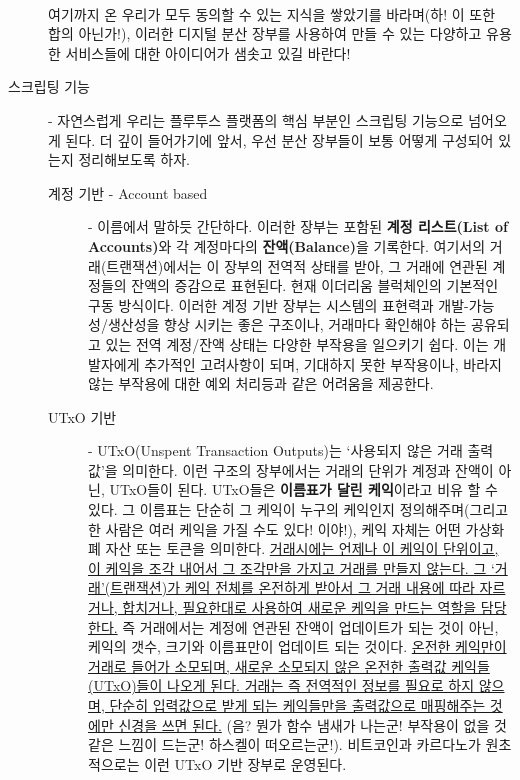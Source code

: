 \documentclass[a4paper, 11pt]{article}
\begin{document}
\begin{description}
        \paragraph{} 여기까지 온 우리가 모두 동의할 수 있는 지식을 쌓았기를 바라며(하! 이 또한 합의 아닌가!), 이러한 디지털 분산 장부를 사용하여 만들 수 있는 다양하고 유용한 서비스들에 대한 아이디어가 샘솟고 있길 바란다!
        
        \item[스크립팅 기능] - 자연스럽게 우리는 플루투스 플랫폼의 핵심 부분인 스크립팅 기능으로 넘어오게 된다. 더 깊이 들어가기에 앞서, 우선 분산 장부들이 보통 어떻게 구성되어 있는지 정리해보도록 하자.
        
        \begin{description}
            \item[계정 기반 - Account based] - 이름에서 말하듯 간단하다. 이러한 장부는 포함된 \textbf{계정 리스트(List of Accounts)}와 각 계정마다의 \textbf{잔액(Balance)}을 기록한다. 여기서의 거래(트랜잭션)에서는 이 장부의 전역적 상태를 받아, 그 거래에 연관된 계정들의 잔액의 증감으로 표현된다. 현재 이더리움 블럭체인의 기본적인 구동 방식이다. 이러한 계정 기반 장부는 시스템의 표현력과 개발-가능성/생산성을 향상 시키는 좋은 구조이나, 거래마다 확인해야 하는 공유되고 있는 전역 계정/잔액 상태는 다양한 부작용을 일으키기 쉽다. 이는 개발자에게 추가적인 고려사항이 되며, 기대하지 못한 부작용이나, 바라지 않는 부작용에 대한 예외 처리등과 같은 어려움을 제공한다.

            \item[UTxO 기반] - UTxO(Unspent Transaction Outputs)는 `사용되지 않은 거래 출력값'을 의미한다. 이런 구조의 장부에서는 거래의 단위가 계정과 잔액이 아닌, UTxO들이 된다. UTxO들은 \textbf{이름표가 달린 케익}이라고 비유 할 수 있다. 그 이름표는 단순히 그 케익이 누구의 케익인지 정의해주며(그리고 한 사람은 여러 케익을 가질 수도 있다! 이야!), 케익 자체는 어떤 가상화폐 자산 또는 토큰을 의미한다. \uline{거래시에는 언제나 이 케익이 단위이고, 이 케익을 조각 내어서 그 조각만을 가지고 거래를 만들지 않는다. 그 `거래'(트랜잭션)가 케익 전체를 온전하게 받아서 그 거래 내용에 따라 자르거나, 합치거나, 필요한대로 사용하여 새로운 케익을 만드는 역할을 담당한다.} 즉 거래에서는 계정에 연관된 잔액이 업데이트가 되는 것이 아닌, 케익의 갯수, 크기와 이름표만이 업데이트 되는 것이다. \uline{온전한 케익만이 거래로 들어가 소모되며, 새로운 소모되지 않은 온전한 출력값 케익들(UTxO)들이 나오게 된다. 거래는 즉 전역적인 정보를 필요로 하지 않으며, 단순히 입력값으로 받게 되는 케익들만을 출력값으로 매핑해주는 것에만 신경을 쓰면 된다.} (음? 뭔가 함수 냄새가 나는군! 부작용이 없을 것 같은 느낌이 드는군! 하스켈이 떠오르는군!). 비트코인과 카르다노가 원초적으로는 이런 UTxO 기반 장부로 운영된다.
        \end{description}


\end{description}
\end{document}
